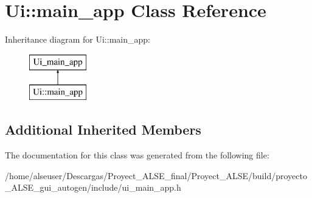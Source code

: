 \hypertarget{class_ui_1_1main__app}{}\section{Ui\+:\+:main\+\_\+app Class Reference}
\label{class_ui_1_1main__app}
Inheritance diagram for Ui\+:\+:main\+\_\+app\+:\begin{figure}[H]
\begin{center}
\leavevmode
\includegraphics[height=2.000000cm]{class_ui_1_1main__app}
\end{center}
\end{figure}
\subsection*{Additional Inherited Members}


The documentation for this class was generated from the following file\+:\begin{DoxyCompactItemize}
\item 
/home/alseuser/\+Descargas/\+Proyect\+\_\+\+A\+L\+S\+E\+\_\+final/\+Proyect\+\_\+\+A\+L\+S\+E/build/proyecto\+\_\+\+A\+L\+S\+E\+\_\+gui\+\_\+autogen/include/ui\+\_\+main\+\_\+app.\+h\end{DoxyCompactItemize}
